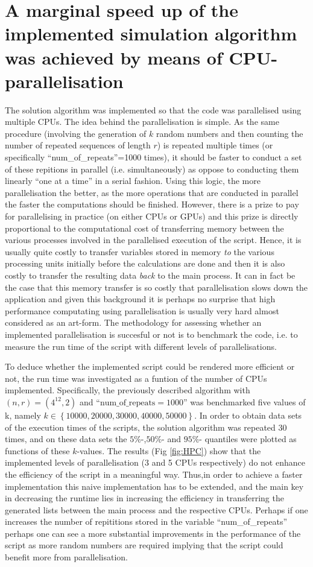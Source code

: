\documentclass{article}
\begin{document}
\section{A marginal speed up of the implemented simulation algorithm was achieved by means of CPU-parallelisation}
The solution algorithm was implemented so that the code was parallelised using multiple CPUs. The idea behind the parallelisation is simple. As the same procedure (involving the generation of $k$ random numbers and then counting the number of repeated sequences of length $r$) is repeated multiple times (or specifically ``num\_of\_repeats''=1000 times), it should be faster to conduct a set of these repitions in parallel (i.e. simultaneously) as oppose to conducting them linearly ``one at a time'' in a serial fashion. Using this logic, the more parallelisation the better, as the more operations that are conducted in parallel the faster the computations should be finished. However, there is a prize to pay for parallelising in practice (on either CPUs or GPUs) and this prize is directly proportional to the computational cost of transferring memory between the various processes involved in the parallelised execution of the script. Hence, it is usually quite costly to transfer variables stored in memory \textit{to} the various processing units initially before the calculations are done and then it is also costly to transfer the resulting data \textit{back} to the main process. It can in fact be the case that this memory transfer is so costly that parallelisation slows down the application and given this background it is perhaps no surprise that high performance computating using parallelisation is usually very hard almost considered as an art-form. The methodology for assessing whether an implemented parallelisation is succesful or not is to benchmark the code, i.e. to measure the run time of the script with different levels of parallelisations. 

To deduce whether the implemented script could be rendered more efficient or not, the run time was investigated as a funtion of the number of CPUs implemented. Specifically, the previously described algorithm with $(n,r)=(4^{12},2)$ and ``$\textrm{num\_of\_repeats}=1000$'' was benchmarked five values of k, namely $k\in\left\{10000,20000,30000,40000,50000\right\}$. In order to obtain data sets of the execution times of the scripts, the solution algorithm was repeated $30$ times, and on these data sets the $5\%$-,$50\%$- and $95\%$- quantiles were plotted as functions of these $k$-values. The results (Fig \ref{fig:HPC}) show that the implemented levels of parallelisation (3 and 5 CPUs respectively) do not enhance the efficiency of the script in a meaningful way. Thus,in order to achieve a faster implementation this naive implementation has to be extended, and the main key in decreasing the runtime lies in increasing the efficiency in transferring the generated lists between the main process and the respective CPUs. Perhaps if one increases the number of repititions stored in the variable ``num\_of\_repeats'' perhaps one can see a more substantial improvements in the performance of the script as more random numbers are required implying that the script could benefit more from parallelisation.
\end{document}
